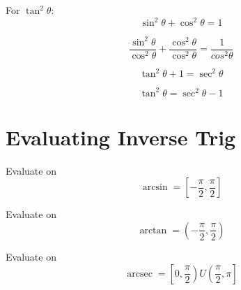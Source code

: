 \begin{minipage}{0.7\textwidth}
\begin{framed}
  For $\tan^2\theta:$
  \begin{equation*}
    \sin^2\theta + \cos^2\theta = 1
  \end{equation*}

  \begin{equation*}
    \frac{\sin^2\theta}{\cos^2\theta} + \frac{\cos^2\theta}{\cos^2\theta} = 
    \frac{1}{cos^2\theta}
  \end{equation*}

  \begin{equation*}
    \tan^2\theta + 1 = \sec^2\theta
  \end{equation*}

  \begin{equation*}
    \tan^2\theta = \sec^2\theta - 1
  \end{equation*}

\vspace{0.5cm}
\end{framed}
\end{minipage}


\section{Evaluating Inverse Trig}

\begin{framed}
  \noindent Evaluate on 
  \begin{equation*}
    \operatorname{arcsin} = \left[-\frac{\pi}{2}, \frac{\pi}{2}\right]
  \end{equation*}
\end{framed}

\begin{framed}
  \noindent Evaluate on 
  \begin{equation*}
    \operatorname{arctan} = \left(-\frac{\pi}{2}, \frac{\pi}{2}\right)
  \end{equation*}
\end{framed}

\begin{framed}
  \noindent Evaluate on 
  \begin{equation*}
    \operatorname{arcsec} = \left[0, \frac{\pi}{2}\right)U\left(\frac{\pi}{2}, \pi\right]
  \end{equation*}
\end{framed}